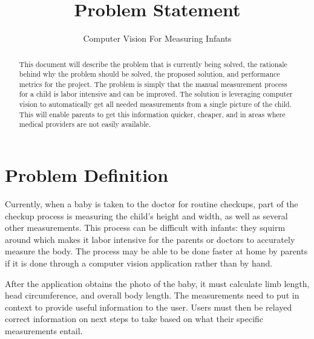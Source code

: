 \documentclass[10pt, draftclsnofoot, letterpaper, margin=.75in, onecolumn]{IEEEtran}
\begin{document}
\renewcommand{\familydefault}{\sfdefault}

\title{Problem Statement}
\author{
Computer Vision For Measuring Infants}


\begin{titlepage}
\maketitle
\begin{abstract}
\noindent This document will describe the problem that is currently being solved, the rationale behind why the problem should be solved, the proposed solution, and performance metrics for the project. The problem is simply that the manual measurement process for a child is labor intensive and can be improved. The solution is leveraging computer vision to automatically get all needed measurements from a single picture of the child. This will enable parents to get this information quicker, cheaper, and in areas where medical providers are not easily available.
\end{abstract}

\end{titlepage}


\section{Problem Definition}
\par \noindent Currently, when a baby is taken to the doctor for routine checkups, part of the checkup process is measuring the child's height and width, as well as several other measurements. This process can be difficult with infants: they squirm around which makes it labor intensive for the parents or doctors to accurately measure the body. The process may be able to be done faster at home by parents if it is done through a computer vision application rather than by hand. \\

\par \noindent After the application obtains the photo of the baby, it must calculate limb length, head circumference, and overall body length. The measurements need to put in context to provide useful information to the user. Users must then be relayed correct information on next steps to take based on what their specific measurements entail.\\
\end{document}
